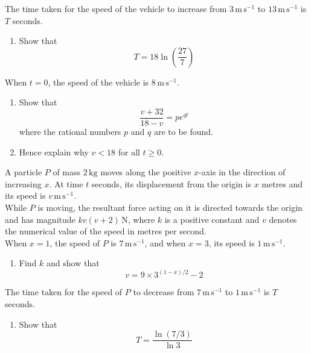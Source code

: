 \documentclass[leqno]{article}
\begin{document}
\begin{enumerate}[
  label=\textbf{\arabic*.},
  leftmargin=*,
  topsep=0pt,
  partopsep=0pt,
  parsep=0pt
]
The time taken for the speed of the vehicle to increase from $3\,\mathrm{m\,s^{-1}}$ to $13\,\mathrm{m\,s^{-1}}$ is $T$ seconds. \\

\begin{enumerate}[label=\textbf{(\alph*)}]
  \item Show that
  \[
  T=18\ln\left(\frac{27}{7}\right)
  \]
\end{enumerate}
When $t=0$, the speed of the vehicle is $8\,\mathrm{m\,s^{-1}}$. \\
\begin{enumerate}[label=\textbf{(\alph*)}, resume]
  \item Show that
  \[
  \frac{v+32}{18-v}=pe^{qt}
  \]
  where the rational numbers $p$ and $q$ are to be found.  \\
  \item Hence explain why $v<18$ for all $t\geq 0$.  \\
\end{enumerate}

\newpage

\questionitem

A particle $P$ of mass $2\,\mathrm{kg}$ moves along the positive $x$-axis in the direction of increasing $x$. At time $t$ seconds, its displacement from the origin is $x$ metres and its speed is $v\,\mathrm{m\,s^{-1}}$. \\

While $P$ is moving, the resultant force acting on it is directed towards the origin and has magnitude $kv(v+2)\,\mathrm{N}$, where $k$ is a positive constant and $v$ denotes the numerical value of the speed in metres per second. \\

When $x=1$, the speed of $P$ is $7\,\mathrm{m\,s^{-1}}$, and when $x=3$, its speed is $1\,\mathrm{m\,s^{-1}}$. \\

\begin{enumerate}[label=\textbf{(\alph*)}]
  \item Find $k$ and show that
  \[
  v=9\times 3^{(1-x)/2}-2
  \]
\end{enumerate}
The time taken for the speed of $P$ to decrease from $7\,\mathrm{m\,s^{-1}}$ to $1\,\mathrm{m\,s^{-1}}$ is $T$ seconds. \\
\begin{enumerate}[label=\textbf{(\alph*)}, resume]
  \item Show that
  \[
  T=\frac{\ln(7/3)}{\ln 3}
  \]
\end{enumerate}


\end{enumerate}
\end{document}
